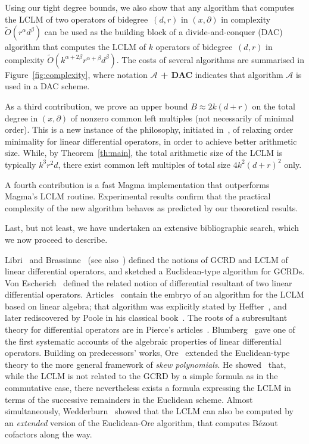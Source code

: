 \documentclass{sig-alt-full}
\newcommand{\pa} { \partial}
\newcommand{\bigOsoft}{\widetilde{{O}}}
\begin{document}
Using our tight degree bounds, we also show that any algorithm that
computes the LCLM of two operators of bidegree~$(d,r)$ in $(x,\pa)$ in
complexity $\bigOsoft(r^\alpha d^\beta)$ can be used as the building block of
a divide-and-conquer (DAC) algorithm that computes the LCLM of $k$ operators
of bidegree~$(d,r)$ in complexity $\bigOsoft(k^{\alpha+2\beta}
r^{\alpha+\beta} d^\beta)$. The costs of several algorithms
are summarised in Figure~\ref{fig:complexity}, where notation {\bf
$\mathcal{A}$ + DAC} indicates that algorithm {\bf $\mathcal{A}$} is used in
a DAC scheme.

As a third contribution, we prove an upper bound $B \approx 2k(d+r)$ on the total degree in $(x,\partial)$ of nonzero common left multiples
(not necessarily of minimal order). 
This is a new instance of the philosophy, initiated
in~\cite{BoChLeSaSc07}, of relaxing order minimality for linear differential
operators, in order to achieve better arithmetic size. While, by
Theorem~\ref{th:main}, the total arithmetic size of the LCLM is typically
$k^3r^2d$, there exist common left multiples of total size $4k^2 (d+r)^2$
only.

A fourth contribution is a fast Magma implementation
that outperforms Magma's  LCLM routine.
Experimental results 
confirm that the practical complexity of the new algorithm behaves as predicted by our
theoretical results. 

Last, but not least, we have undertaken an extensive bibliographic search,
which we now proceed to describe.

\medskip {} Libri~\cite{Libri1833} and
Brassinne~\cite{Brassinne1864} (see also~\cite{Demidov83}) defined the notions
of GCRD and LCLM of linear differential operators, and sketched a
Euclidean-type algorithm for GCRDs. Von
Escherich~\cite{Escherich1883} defined the related notion of differential
resultant of two linear differential operators. 
Articles~\cite{Brassinne1864,Escherich1883} contain the embryo of an algorithm for the LCLM
based on linear algebra; that algorithm was explicitly stated by
Heffter~\cite{Heffter1896}, and later rediscovered by Poole in his classical
book~\cite{Poole36}. The roots of a subresultant theory for differential
operators are in Pierce's articles~\cite{Pierce1903,Pierce1904}.
Blumberg~\cite{Blumberg1912} gave one of the first systematic accounts of the
algebraic properties of linear differential operators. Building on
predecessors' works, Ore~\cite{Ore32,Ore33} extended the Euclidean-type theory
to the more general framework of \emph{skew polynomials}. He
showed~\cite[Theorem~8, \S3]{Ore33} that, while the LCLM is not related to the
GCRD by a simple formula as in the commutative case, there nevertheless exists
a formula expressing the LCLM in terms of the successive remainders in the
Euclidean scheme.
Almost simultaneously, Wedderburn~\cite[\S7-8]{Wedderburn1932} showed that the LCLM can also be computed
by an \emph{extended\/} version of the Euclidean-Ore algorithm, that computes
Bézout cofactors along the way.
\end{document}
